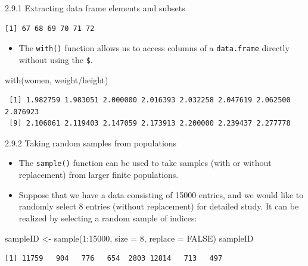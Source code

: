 \documentclass[
  9pt,
  a4paper,
  ignorenonframetext,
  notheorems]{beamer}
\newenvironment{Shaded}{\begin{snugshade}}{\end{snugshade}}
\newcommand{\AttributeTok}[1]{\textcolor[rgb]{0.40,0.45,0.13}{#1}}
\newcommand{\ConstantTok}[1]{\textcolor[rgb]{0.56,0.35,0.01}{#1}}
\newcommand{\DecValTok}[1]{\textcolor[rgb]{0.68,0.00,0.00}{#1}}
\newcommand{\FunctionTok}[1]{\textcolor[rgb]{0.28,0.35,0.67}{#1}}
\newcommand{\NormalTok}[1]{\textcolor[rgb]{0.00,0.23,0.31}{#1}}
\newcommand{\OtherTok}[1]{\textcolor[rgb]{0.00,0.23,0.31}{#1}}
\newcommand{\SpecialCharTok}[1]{\textcolor[rgb]{0.37,0.37,0.37}{#1}}
\providecommand{\tightlist}{%
  \setlength{\itemsep}{0pt}\setlength{\parskip}{0pt}}\usepackage{longtable,booktabs,array}
\begin{document}
\begin{frame}[fragile]
\begin{block}{2.9.1 Extracting data frame elements and subsets}
\begin{verbatim}
[1] 67 68 69 70 71 72
\end{verbatim}

\begin{itemize}
\tightlist
\item
  The \texttt{with()} function allows us to access columns of a
  \texttt{data.frame} directly without using the \texttt{\$}.
\end{itemize}

\begin{Shaded}
\begin{Highlighting}[]
\FunctionTok{with}\NormalTok{(women, weight}\SpecialCharTok{/}\NormalTok{height)}
\end{Highlighting}
\end{Shaded}

\begin{verbatim}
 [1] 1.982759 1.983051 2.000000 2.016393 2.032258 2.047619 2.062500 2.076923
 [9] 2.106061 2.119403 2.147059 2.173913 2.200000 2.239437 2.277778
\end{verbatim}
\end{block}
\end{frame}

\begin{frame}[fragile]
\begin{block}{2.9.2 Taking random samples from populations}
\protect\hypertarget{taking-random-samples-from-populations}{}
\begin{itemize}
\tightlist
\item
  The \texttt{sample()} function can be used to take samples (with or
  without replacement) from larger finite populations.
\end{itemize}

\begin{itemize}
\tightlist
\item
  Suppose that we have a data consisting of 15000 entries, and we would
  like to randomly select 8 entries (without replacement) for detailed
  study. It can be realized by selecting a random sample of indices:
\end{itemize}

\begin{Shaded}
\begin{Highlighting}[]
\NormalTok{sampleID }\OtherTok{\textless{}{-}} \FunctionTok{sample}\NormalTok{(}\DecValTok{1}\SpecialCharTok{:}\DecValTok{15000}\NormalTok{, }\AttributeTok{size =} \DecValTok{8}\NormalTok{, }\AttributeTok{replace =} \ConstantTok{FALSE}\NormalTok{) }
\NormalTok{sampleID}
\end{Highlighting}
\end{Shaded}

\begin{verbatim}
[1] 11759   904   776   654  2803 12814   713   497
\end{verbatim}
\end{block}
\end{frame}
\end{document}
